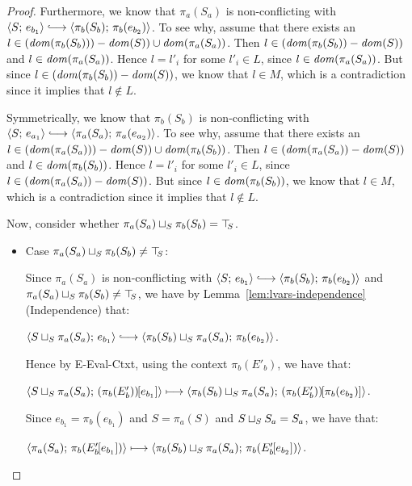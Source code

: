 \begin{proof}
  Furthermore, we know that $\pi_a(S_a)$ is non-conflicting with
  $\config{S}{e_{b_1}} \parstepsto
  \config{\pi_b(S_b)}{\pi_b(e_{b_2})}$.  To see why, assume that there
  exists an $l \in (\mathit{dom}(\pi_b(S_b))) - \mathit{dom}(S)) \cup
  \mathit{dom}(\pi_a(S_a))$.  Then $l \in (\mathit{dom}(\pi_b(S_b)) - \mathit{dom}(S))$ and $l
  \in \mathit{dom}(\pi_a(S_a))$.  Hence $l = l'_i$ for some $l'_i \in L$,
  since $l \in \mathit{dom}(\pi_a(S_a))$.  But since $l \in (\mathit{dom}(\pi_b(S_b))
  - \mathit{dom}(S))$, we know that $l \in M$, which is a contradiction since
  it implies that $l \notin L$.

  Symmetrically, we know that $\pi_b(S_b)$ is non-conflicting with
  $\config{S}{e_{a_1}} \parstepsto
  \config{\pi_a(S_a)}{\pi_a(e_{a_2})}$.  To see why, assume that there
  exists an $l \in (\mathit{dom}(\pi_a(S_a))) - \mathit{dom}(S)) \cup
  \mathit{dom}(\pi_b(S_b))$.  Then $l \in (\mathit{dom}(\pi_a(S_a)) - \mathit{dom}(S))$ and $l
  \in \mathit{dom}(\pi_b(S_b))$.  Hence $l = l'_i$ for some $l'_i \in L$,
  since $l \in (\mathit{dom}(\pi_a(S_a)) - \mathit{dom}(S))$.  But since $l \in
  \mathit{dom}(\pi_b(S_b))$, we know that $l \in M$, which is a contradiction
  since it implies that $l \notin L$.


  Now, consider whether $\pi_a(S_a) \sqcup_{S} \pi_b(S_b) = \top\hspace{-0.85mm}_{S}$.

  \begin{itemize}
  \item Case $\pi_a(S_a) \sqcup_{S} \pi_b(S_b) \neq \top\hspace{-0.85mm}_{S}$:

    Since $\pi_a(S_a)$ is non-conflicting with $\config{S}{e_{b_1}}
    \parstepsto \config{\pi_b(S_b)}{\pi_b(e_{b_2})}$ and
    $\pi_a(S_a) \sqcup_{S} \pi_b(S_b) \neq \top\hspace{-0.85mm}_{S}$, we have by
    Lemma~\ref{lem:lvars-independence} (Independence) that:

    $\config{\lubstore{S}{\pi_a(S_a)}}{e_{b_1}} \parstepsto
    \config{\lubstore{\pi_b(S_b)}{\pi_a(S_a)}}{\pi_b(e_{b_2})}$.

    Hence by {\sc E-Eval-Ctxt}, using the context $\pi_b(E'_b)$, we have that:

    $\langle S \sqcup_{S} \pi_a(S_a);\, (\pi_b(E'_b))\hspace{-1mm}\left[e_{b_1}\right] \rangle
    \longmapsto
    \langle \pi_b(S_b) \sqcup_{S} \pi_a(S_a);\, (\pi_b(E'_b))\hspace{-1mm}\left[\pi_b(e_{b_2})\right] \rangle$.

    Since $e_{b_1} = \pi_b(e_{b_1})$ and $S = \pi_a(S)$ and
    $S \sqcup_{S} S_a = S_a$, we have that:

    $\langle \pi_a(S_a);\, \pi_b(E'_b\hspace{-1mm}\left[e_{b_1}\right]) \rangle \longmapsto
    \langle \pi_b(S_b) \sqcup_{S} \pi_a(S_a);\, \pi_b(E'_b\hspace{-1mm}\left[e_{b_2}\right]) \rangle$.



\end{itemize}
\end{proof}
